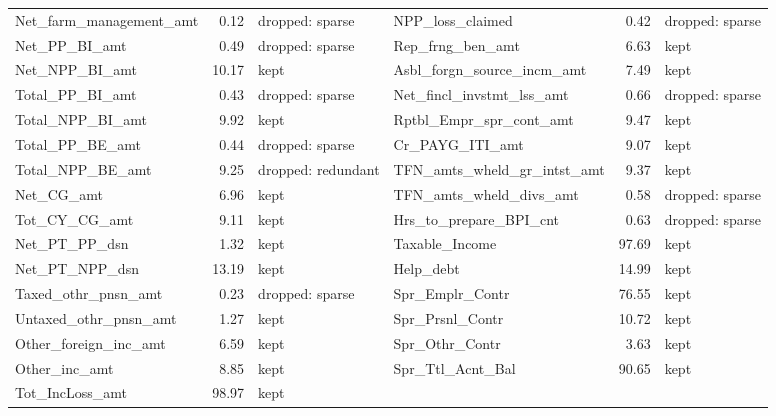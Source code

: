 \begin{table}[H]
{\begin{tabular}{lrl lrl}
        Net\_farm\_management\_amt & 0.12 & dropped: sparse & NPP\_loss\_claimed & 0.42 & dropped: sparse \\
        Net\_PP\_BI\_amt & 0.49 & dropped: sparse & Rep\_frng\_ben\_amt & 6.63 & kept \\
        Net\_NPP\_BI\_amt & 10.17 & kept & Asbl\_forgn\_source\_incm\_amt & 7.49 & kept \\
        Total\_PP\_BI\_amt & 0.43 & dropped: sparse & Net\_fincl\_invstmt\_lss\_amt & 0.66 & dropped: sparse \\
        Total\_NPP\_BI\_amt & 9.92 & kept & Rptbl\_Empr\_spr\_cont\_amt & 9.47 & kept \\
        Total\_PP\_BE\_amt & 0.44 & dropped: sparse & Cr\_PAYG\_ITI\_amt & 9.07 & kept \\
        Total\_NPP\_BE\_amt & 9.25 & dropped: redundant & TFN\_amts\_wheld\_gr\_intst\_amt & 9.37 & kept \\
        Net\_CG\_amt & 6.96 & kept & TFN\_amts\_wheld\_divs\_amt & 0.58 & dropped: sparse \\
        Tot\_CY\_CG\_amt & 9.11 & kept & Hrs\_to\_prepare\_BPI\_cnt & 0.63 & dropped: sparse \\
        Net\_PT\_PP\_dsn & 1.32 & kept & Taxable\_Income & 97.69 & kept \\
        Net\_PT\_NPP\_dsn & 13.19 & kept & Help\_debt & 14.99 & kept \\
        Taxed\_othr\_pnsn\_amt & 0.23 & dropped: sparse & Spr\_Emplr\_Contr & 76.55 & kept \\
        Untaxed\_othr\_pnsn\_amt & 1.27 & kept & Spr\_Prsnl\_Contr & 10.72 & kept \\
        Other\_foreign\_inc\_amt & 6.59 & kept & Spr\_Othr\_Contr & 3.63 & kept \\
        Other\_inc\_amt & 8.85 & kept & Spr\_Ttl\_Acnt\_Bal & 90.65 & kept \\
        Tot\_IncLoss\_amt & 98.97 & kept &  &  &  \\
        \bottomrule
    \end{tabular}}
\end{table}

